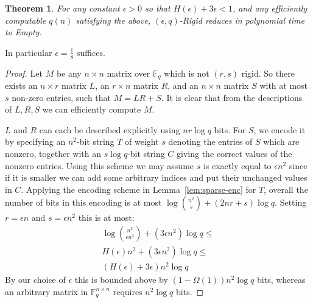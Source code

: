 \documentclass[11pt]{article}
\newtheorem{theorem}{Theorem}
\newtheorem{definition}{Definition}
\newcommand{\todo}[1]{\textcolor{red}{TODO: #1}}
\begin{document}
\begin{theorem}\label{thm:rigid-in-apepp}
For any constant $\epsilon>0$ so that $H(\epsilon) + 3\epsilon < 1$, and any efficiently computable $q(n)$ satisfying the above, {\sc $(\epsilon, q)$-Rigid} reduces in polynomial time to {\sc Empty}.
\end{theorem}
In particular $\epsilon = \frac{1}{8}$ suffices.
\begin{proof}
Let $M$ be any $n \times n$ matrix over $\mathbb{F}_q$ which is not $(r,s)$ rigid. So there exists an $n \times r$ matrix $L$, an $r \times n$ matrix $R$, and an $n \times n$ matrix $S$ with at most $s$ non-zero entries, such that $M = LR + S$. It is clear that from the descriptions of $L,R,S$ we can efficiently compute $M$.

$L$ and $R$ can each be described explicitly using $nr \log q$ bits. For $S$, we encode it by specifying an $n^2$-bit string $T$ of weight $s$ denoting the entries of $S$ which are nonzero, together with an $s \log q$-bit string $C$ giving the correct values of the nonzero entries. Using this scheme we may assume $s$ is exactly equal to $\epsilon n^2$ since if it is smaller we can add some arbitrary indices and put their unchanged values in $C$. Applying the encoding scheme in Lemma~\ref{lem:sparse-enc} for $T$, overall the number of bits in this encoding is at most $\log\binom{n^2}{s} + (2nr + s)\log q$. Setting $r = \epsilon n$ and $s= \epsilon n^2$ this is at most:
\begin{gather*}
\log\binom{n^2}{\epsilon n^2} + (3\epsilon n^2)\log q
 \leq \\
H(\epsilon)n^2 + (3 \epsilon n^2)\log q \leq \\
(H(\epsilon) + 3\epsilon)n^2\log q
\end{gather*}
By our choice of $\epsilon$ this is bounded above by $(1- \Omega(1))n^2\log q$ bits, whereas an arbitrary matrix in  $\mathbb{F}_q^{n \times n}$ requires $n^2\log q$ bits.
\end{proof}

\end{document}
